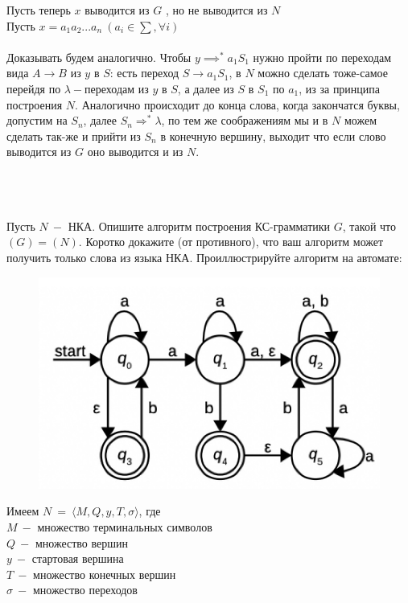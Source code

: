 \documentclass[10pt]{article}
\begin{document}
{\begin{enumerate}
		Пусть теперь $x$ выводится из $G$ , но не выводится из $N$\\
		Пусть $x=a_1a_2...a_n\ (a_i \in \sum, \forall i)$\\\\
		Доказывать будем аналогично. Чтобы $y\implies^*a_1S_1$ нужно пройти по переходам вида $A\rightarrow B$ из $y$ в $S$: есть переход $S\rightarrow a_1S_1$, в $N$ можно сделать тоже-самое перейдя по $\lambda-$переходам из $y$ в $S$, а далее из $S$ в $S_1$ по $a_1$, из за принципа построения $N$. Аналогично происходит до конца слова, когда закончатся буквы, допустим на $S_n$, далее $S_n\Rightarrow^*\lambda$, по тем же соображениям мы и в $N$ можем сделать так-же и прийти из $S_n$ в конечную вершину, выходит что если слово выводится из $G$ оно выводится и из $N$.\\\\
		\\\\
		{\Large\item Пусть $N\ -$ НКА. Опишите алгоритм построения КС-грамматики $G$, такой что $(G)=(N)$. Коротко докажите (от противного), что ваш алгоритм может получить только слова из языка НКА. Проиллюстрируйте алгоритм на автомате:}
		\begin{figure}[H]
			\includegraphics[scale=0.6]{1}
		\end{figure}
		Имеем $N\ =\ \langle M,Q,y,T,\sigma\rangle$, где\\
		$M\ -$ множество терминальных символов\\
		$Q\ -$ множество вершин\\
		$y\ -$ стартовая вершина\\
		$T\ -$ множество конечных вершин\\
		$\sigma\ -$ множество переходов\\\\

\end{enumerate}}
\end{document}
